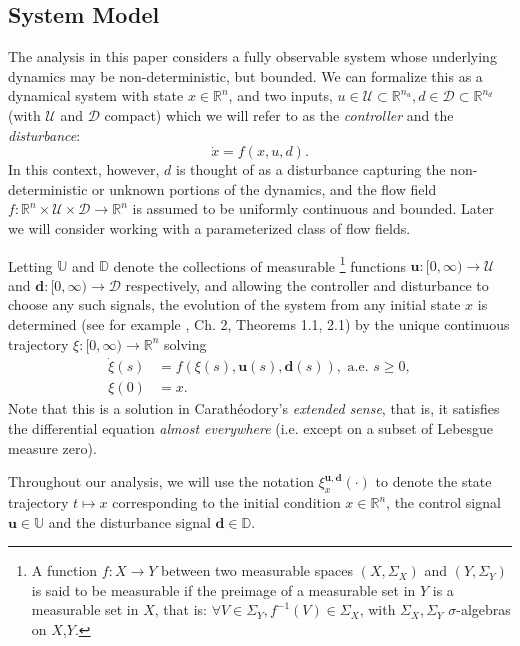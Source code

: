 \documentclass{journal}
\newcommand{\D}{\mathcal{D}}
\newcommand{\U}{\mathcal{U}}
\newcommand{\DD}{\mathbb{D}}
\newcommand{\RR}{\mathbb{R}}
\newcommand{\UU}{\mathbb{U}}
\newcommand{\bu}{\bm{u}}
\newcommand{\bdelta}{\bm{d}}
\newcommand{\bx}{\xi}
\begin{document}
\subsection{System Model \label{subsec:dynamics}}

The analysis in this paper considers a fully observable system whose underlying dynamics may be non-deterministic, but bounded. 
We can formalize this as a dynamical system with state $x\in\RR^n$, and two inputs, $u\in\U\subset\RR^{n_u},  d\in\D\subset\RR^{n_d}$
(with $\U$ and $\D$ compact)
which we will refer to as the \emph{controller} and the \emph{disturbance}:
\begin{equation}\label{fxud}
\dot{x} = f(x,u, d).
\end{equation}
In this context, however, 
$d$ is thought of as a disturbance capturing the non-deterministic or unknown portions of the dynamics, and the flow field $f: \RR^n \times \U \times \D\rightarrow\RR^n$ is assumed to be uniformly continuous and bounded. Later we will consider working with a parameterized class of flow fields.

Letting $\UU $ and $\DD$ denote the collections of measurable%
	\footnote{A function $f:X\to Y$ between two measurable spaces $(X,\Sigma_X)$ and $(Y,\Sigma_Y)$
	is said to be measurable if the preimage of a measurable set in $Y$ is a measurable set in $X$, that is:
	$\forall V\in\Sigma_Y, f^{-1}(V)\in\Sigma_X$, with $\Sigma_X,\Sigma_Y$ $\sigma$-algebras on $X$,$Y$.}
functions $\bm u: [0,\infty)\to \U $ and $\bm d: [0,\infty)\to \D$ respectively,
and allowing the controller and disturbance to choose any such signals,
the evolution of the system
from any initial state $x$
is determined (see for example \cite{Coddington1955}, Ch. 2, Theorems 1.1, 2.1) by the unique continuous trajectory $\bx:[0,\infty)\to\RR^n$ solving
\begin{equation}\label{eq:xdot}
\begin{split}
\dot{\bx}(s) &= f(\bx(s),\bu(s),\bdelta(s)), \text{ a.e. }s\ge 0,\\
\bx(0) &= x.
\end{split}
\end{equation}
Note that this is a solution in Carath\'eodory's \emph{extended sense}, that is, it satisfies the differential equation \emph{almost everywhere} (i.e. except on a subset of Lebesgue measure zero).


Throughout our analysis, we will use the notation $\bx_{x}^{\bu,\bdelta}(\cdot)$ to denote the state trajectory $t\mapsto x$ corresponding to the initial condition $x\in\RR^n$, the control signal $\bu\in\UU$ and the disturbance signal $\bdelta\in\DD$.
\end{document}
